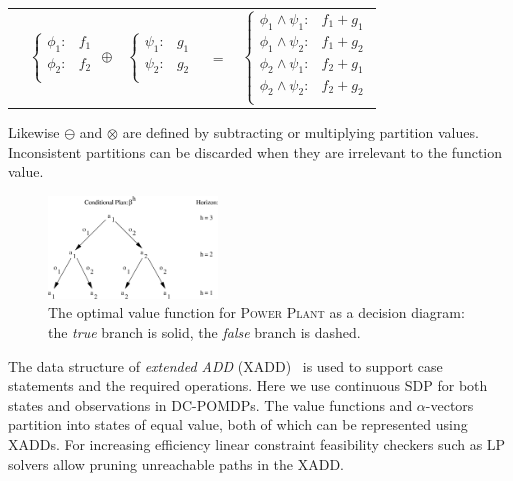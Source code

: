 \documentclass{article}
\begin{document}
{\footnotesize 
\begin{center}
\begin{tabular}{r c c c l}
&
\hspace{-6mm} 
  $\begin{cases}
    \phi_1: & f_1 \\ 
    \phi_2: & f_2 \\ 
  \end{cases}$
$\oplus$
&
\hspace{-4mm}
  $\begin{cases}
    \psi_1: & g_1 \\ 
    \psi_2: & g_2 \\ 
  \end{cases}$
&
\hspace{-2mm} 
$ = $
&
\hspace{-2mm}
  $\begin{cases}
  \phi_1 \wedge \psi_1: & f_1 + g_1 \\ 
  \phi_1 \wedge \psi_2: & f_1 + g_2 \\ 
  \phi_2 \wedge \psi_1: & f_2 + g_1 \\ 
  \phi_2 \wedge \psi_2: & f_2 + g_2 \\ 
  \end{cases}$
\end{tabular}
\end{center}
}
\normalsize

Likewise $\ominus$ and $\otimes$ are defined by subtracting or multiplying partition values.  Inconsistent partitions can be discarded when they are irrelevant to the function value.
\begin{figure}[t]
\begin{center}
\includegraphics[width=0.4\textwidth]{cond_plan2.pdf}
\end{center}
\vspace{-3mm}
\caption{%
The optimal value function for \textsc{Power Plant}
as a decision diagram: 
the \emph{true} branch is solid, the \emph{false}
branch is dashed.} 
\end{figure}
The data structure of \emph{extended ADD} (XADD)~\cite{sanner_uai11} is used to support
case statements and the required operations.  Here we use continuous SDP for both states and observations in DC-POMDPs. The value functions and $\alpha$-vectors partition into states of equal value, both of which can be represented using XADDs. For increasing efficiency linear constraint feasibility checkers such as LP solvers allow pruning unreachable paths in the XADD.
\end{document}

